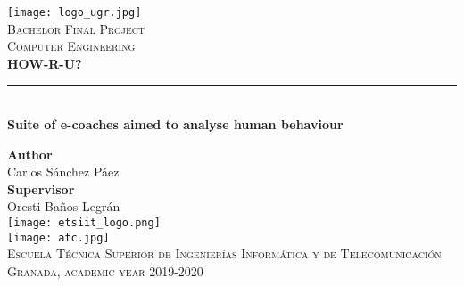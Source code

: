 \begin{titlepage}

 \newlength{\centeroffset}
 \setlength{\centeroffset}{-0.5\oddsidemargin}
 \addtolength{\centeroffset}{0.5\evensidemargin}
 \thispagestyle{empty}

 \noindent\hspace*{\centeroffset}
 \begin{minipage}{\textwidth}

  \centering
  \texttt{[image: logo\_ugr.jpg]}\\[1.4cm]

  \textsc{ \Large Bachelor Final Project\\[0.2cm]}
  \textsc{Computer Engineering}\\[1cm]

  {\Huge\bfseries HOW-R-U?\\}
  \noindent\rule[-1ex]{\textwidth}{3pt}\\[3.5ex]
  {\large\bfseries Suite of e-coaches aimed to analyse human behaviour}
 \end{minipage}

 \vspace{1cm}
 \noindent\hspace*{\centeroffset}
 \begin{minipage}{\textwidth}
  \centering

  \textbf{Author}\\ {Carlos Sánchez Páez}\\[2.5ex]
  \textbf{Supervisor}\\
  {Oresti Baños Legrán}\\[3ex]
  \texttt{[image: etsiit\_logo.png]}\\[0.1cm]
  \vspace{2.5ex}
  \texttt{[image: atc.jpg]}\\[0.1cm]
  \vspace{1cm}
  \textsc{Escuela Técnica Superior de Ingenierías Informática y de Telecomunicación}\\
  \vspace{1cm}
  \textsc{Granada, academic year 2019-2020}
 \end{minipage}
\end{titlepage}
